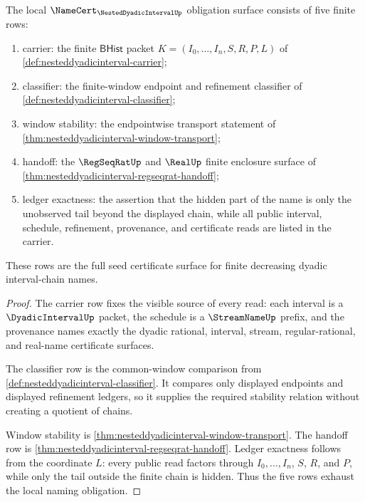\begin{theorem}
\label{thm:nesteddyadicinterval-namecert-obligation-surface}
The local $\NameCert_{\NestedDyadicIntervalUp}$ obligation surface consists of five finite rows:
\begin{enumerate}
\item carrier: the finite $\mathsf{BHist}$ packet $K=(I_0,\ldots,I_n,S,R,P,L)$ of \autoref{def:nesteddyadicinterval-carrier};
\item classifier: the finite-window endpoint and refinement classifier of \autoref{def:nesteddyadicinterval-classifier};
\item window stability: the endpointwise transport statement of \autoref{thm:nesteddyadicinterval-window-transport};
\item handoff: the $\RegSeqRatUp$ and $\RealUp$ finite enclosure surface of \autoref{thm:nesteddyadicinterval-regseqrat-handoff};
\item ledger exactness: the assertion that the hidden part of the name is only the unobserved tail beyond the displayed chain, while all public interval, schedule, refinement, provenance, and certificate reads are listed in the carrier.
\end{enumerate}
These rows are the full seed certificate surface for finite decreasing dyadic interval-chain names.
\end{theorem}
\begin{proof}
The carrier row fixes the visible source of every read: each interval is a $\DyadicIntervalUp$ packet, the schedule is a $\StreamNameUp$ prefix, and the provenance names exactly the dyadic rational, interval, stream, regular-rational, and real-name certificate surfaces.

The classifier row is the common-window comparison from \autoref{def:nesteddyadicinterval-classifier}. It compares only displayed endpoints and displayed refinement ledgers, so it supplies the required stability relation without creating a quotient of chains.

Window stability is \autoref{thm:nesteddyadicinterval-window-transport}. The handoff row is \autoref{thm:nesteddyadicinterval-regseqrat-handoff}. Ledger exactness follows from the coordinate $L$: every public read factors through $I_0,\ldots,I_n$, $S$, $R$, and $P$, while only the tail outside the finite chain is hidden. Thus the five rows exhaust the local naming obligation.
\end{proof}

